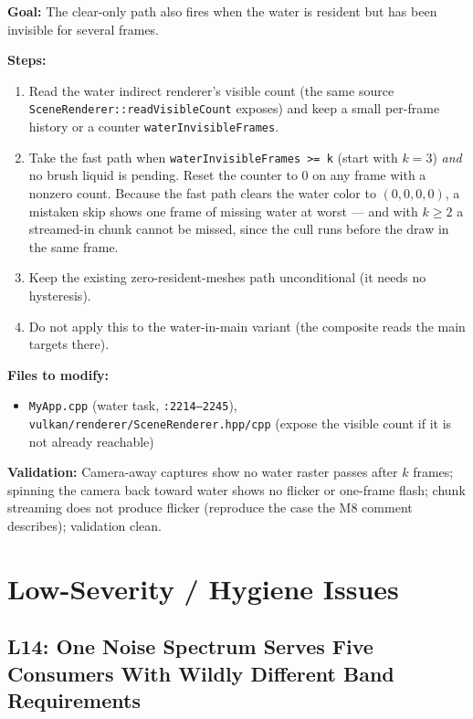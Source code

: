 \documentclass[11pt,a4paper]{article}
\begin{document}
\begin{tcolorbox}[promptbox={Prompt: Add Hysteresis to the Empty-Water Fast Path}]
\textbf{Goal:} The clear-only path also fires when the water is resident but has been invisible for several frames.

\textbf{Steps:}
\begin{enumerate}
    \item Read the water indirect renderer's visible count (the same source
    \texttt{SceneRenderer::readVisibleCount} exposes) and keep a small per-frame history or a counter
    \texttt{waterInvisibleFrames}.
    \item Take the fast path when \texttt{waterInvisibleFrames >= k} (start with $k = 3$) \emph{and} no brush liquid is
    pending. Reset the counter to 0 on any frame with a nonzero count. Because the fast path clears the water color to
    $(0,0,0,0)$, a mistaken skip shows one frame of missing water at worst --- and with $k \ge 2$ a streamed-in chunk
    cannot be missed, since the cull runs before the draw in the same frame.
    \item Keep the existing zero-resident-meshes path unconditional (it needs no hysteresis).
    \item Do not apply this to the water-in-main variant (the composite reads the main targets there).
\end{enumerate}

\textbf{Files to modify:}
\begin{itemize}
    \item \texttt{MyApp.cpp} (water task, \texttt{:2214--2245}), \texttt{vulkan/renderer/SceneRenderer.hpp/cpp}
    (expose the visible count if it is not already reachable)
\end{itemize}

\textbf{Validation:} Camera-away captures show no water raster passes after $k$ frames; spinning the camera back toward
water shows no flicker or one-frame flash; chunk streaming does not produce flicker (reproduce the case the M8 comment
describes); validation clean.
\end{tcolorbox}

\section{Low-Severity / Hygiene Issues}

\subsection{L14: One Noise Spectrum Serves Five Consumers With Wildly Different Band Requirements}
\end{document}
